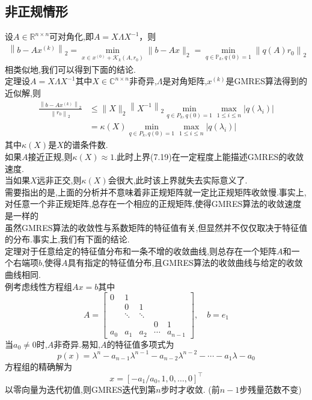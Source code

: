 \documentclass[12pt,a4paper]{article}
\begin{document}
\subsection*{非正规情形}
{\color{blue}设$A \in \mathbb{R}^{n \times n}$可对角化},即$A=X \Lambda X^{-1}$，则
\begin{align*}
\left\|b-A x^{(k)}\right\|_{2}=\min _{x \in x^{(0)}+\mathcal{K}_{k}\left(A, r_{0}\right)}\|b-A x\|_{2}=\min _{q \in \mathbb{P}_{k}, q(0)=1}\left\|q(A) r_{0}\right\|_{2}
\tag{7.18}
\end{align*}
相类似地,我们可以得到下面的结论.\\
{\color{blue}定理}\quad 设$A=X \Lambda X^{-1}$其中$X \in \mathbb{C}^{n \times n}$非奇异,$\Lambda$是对角矩阵,$x^{(k)}$是GMRES算法得到的近似解,则
\begin{align*}
\frac{\left\|b-A x^{(k)}\right\|_{2}}{\left\|r_{0}\right\|_{2}} & \leq\|X\|_{2}\left\|X^{-1}\right\|_{2} \min _{q \in P_{k}, q(0)=1} \max _{1 \leq i \leq n}\left|q\left(\lambda_{i}\right)\right| \\ &=\kappa(X) \min _{q \in P_{k}, q(0)=1} \max _{1 \leq i \leq n}\left|q\left(\lambda_{i}\right)\right|
\tag{7.19}
\end{align*}
其中$\kappa(X)$是$X$的谱条件数.\\
如果$A$接近正规,则$\kappa(X) \approx 1$.此时上界(7.19)在一定程度上能描述GMRES的收敛速度.\\
当如果$X$远非正交,则$\kappa(X)$会很大,此时该上界就失去实际意义了.\\
需要指出的是,上面的分析并不意味着非正规矩阵就一定比正规矩阵收敛慢.事实上,对任意一个非正规矩阵,总存在一个相应的正规矩阵,使得GMRES算法的收敛速度是一样的\\
虽然GMRES算法的收敛性与系数矩阵的特征值有关,但显然并不仅仅取决于特征值的分布.事实上,我们有下面的结论.\\
{\color{blue}定理}\quad 对于任意给定的特征值分布和一条不增的收敛曲线,则总存在一个矩阵$A$和一个右端项$b$,使得$A$具有指定的特征值分布,且GMRES算法的收敛曲线与给定的收敛曲线相同.\\
{\color{blue}例}\quad 考虑线性方程组$A x=b$其中
$$
A=\left[\begin{array}{ccccc}{0} & {1} & {} & {} \\ {} & {0} & {1} \\ {} & {\ddots} & {\ddots} & {} \\ {} & {} & {} & {0} & {1} \\ {a_{0}} & {a_{1}} & {a_{2}} & {\cdots} & {a_{n-1}}\end{array}\right], \quad b=e_{1}
$$
当$a_{0} \neq 0$时,$A$非奇异.易知,$A$的特征值多项式为
$$
p(x)=\lambda^{n}-a_{n-1} \lambda^{n-1}-a_{n-2} \lambda^{n-2}-\cdots-a_{1} \lambda-a_{0}
$$
方程组的精确解为
$$
x=\left[-a_{1} / a_{0}, 1,0, \ldots, 0\right]^{\top}
$$
以零向量为迭代初值,则GMRES迭代到第$n$步时才收敛. (前$n-1$步残量范数不变)\\
\end{document}
